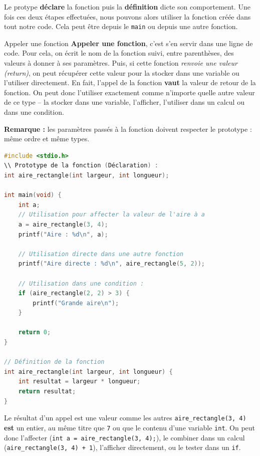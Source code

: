 Le protype \textbf{déclare} la fonction puis la \textbf{définition} dicte son comportement. Une fois ces deux étapes effectuées, nous pouvons alors utiliser la fonction créée dans tout notre code. Cela peut être depuis le \texttt{main} ou depuis une autre fonction. 

\begin{UPSTIinfor}{Appeler une fonction}
  \textbf{Appeler une fonction}, c'est s'en servir dans une ligne de code. Pour cela, on écrit le nom de la fonction suivi, entre parenthèses, des valeurs à donner à ses paramètres. Puis, si cette fonction \textit{renvoie une valeur (return)}, on peut récupérer cette valeur pour la stocker dans une variable ou l'utiliser directement. En fait, l'appel de la fonction \textbf{vaut} la valeur de retour de la fonction. On peut donc l'utiliser exactement comme n'importe quelle autre valeur de ce type -- la stocker dans une variable, l'afficher, l'utiliser dans un calcul ou dans une condition.

  \textbf{Remarque :} les paramètres passés à la fonction doivent respecter le prototype : même ordre et même types.
\end{UPSTIinfor}
  
  \begin{lstlisting}[language=c,caption={Différentes façons d'utiliser le résultat de \texttt{aire\_rectangle}}]
#include <stdio.h>
\\ Prototype de la fonction (Déclaration) : 
int aire_rectangle(int largeur, int longueur);

int main(void) {
    int a;
    // Utilisation pour affecter la valeur de l'aire à a
    a = aire_rectangle(3, 4);
    printf("Aire : %d\n", a);

    // Utilisation directe dans une autre fonction
    printf("Aire directe : %d\n", aire_rectangle(5, 2));

    // Utilisation dans une condition : 
    if (aire_rectangle(2, 2) > 3) {
        printf("Grande aire\n");
    }

    return 0;
}

// Définition de la fonction
int aire_rectangle(int largeur, int longueur) {
    int resultat = largeur * longueur;
    return resultat;
}
\end{lstlisting}

\begin{UPSTIinfor}{Le résultat d'un appel est une valeur comme les autres}
  \texttt{aire\_rectangle(3, 4)} \textbf{est} un entier, au même titre que \texttt{7} ou que le contenu d'une variable \texttt{int}. On peut donc l'affecter (\texttt{int a = aire\_rectangle(3, 4);}), le combiner dans un calcul (\texttt{aire\_rectangle(3, 4) + 1}), l'afficher directement, ou le tester dans un \texttt{if}.
\end{UPSTIinfor}

